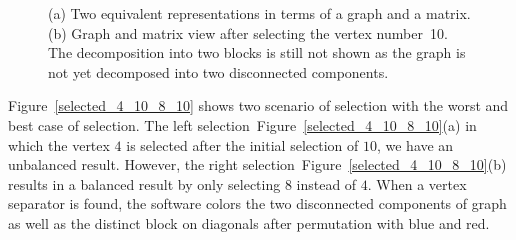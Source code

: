 \documentclass[11pt, twoside,a4paper]{book}
\newcommand{\figref}[1]{Figure~\protect\ref{#1}}
\begin{document}
\begin{figure}
\centering
{}
\hfill
{}
\caption{
(a) Two equivalent representations in terms of a graph and a matrix.
(b) Graph and matrix view after selecting the vertex number~10.
The decomposition into two blocks is still not shown as the graph is not yet
decomposed into two disconnected components.}
\label{initial_10}
\end{figure}

Figure~\ref{selected_4_10_8_10} shows two scenario of selection with 
the worst and best case of selection. The left selection~\figref{selected_4_10_8_10}(a)
in which the vertex
$4$ is selected after the initial selection of $10$, we have an unbalanced result.
However, the right selection~\figref{selected_4_10_8_10}(b) results in a balanced result
by only selecting $8$ instead of $4$. 
When a vertex separator is found, the software colors the two disconnected components of graph
as well as the distinct block on diagonals after permutation
with blue and red.
\end{document}

